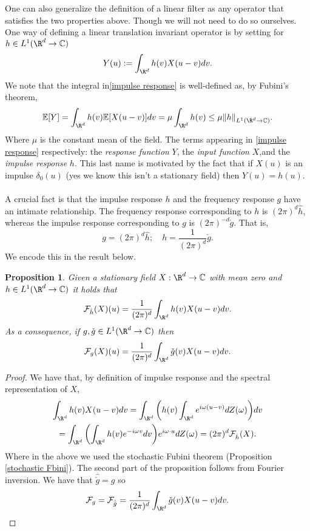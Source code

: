 \documentclass[12pt]{article}
\newtheorem{proposition}{Proposition}
\begin{document}
One can also generalize the definition of a linear filter as any operator that satisfies the two properties above. Though we will not need to do so ourselves. One way of defining a linear translation invariant operator is by setting for $h\in L^1(\R^d\to\C)$
\begin{equation}\label{impulse response}
    Y(u):=\int_{\R^d} h(v)X(u-v) dv.
\end{equation}
We note that the integral in\eqref{impulse response} is well-defined as, by Fubini's theorem,
\begin{equation*}
    \mathbb{E}[Y]=\int_{\R^d} h(v)\mathbb{E}[X(u-v)] dv=\mu\int_{\R^d} h(v)\leq \mu\norm{h}_{L^1(\R^d\to\C)}.
\end{equation*}
Where $\mu$ is the constant mean of the field.
The terms appearing in \eqref{impulse response} respectively: the \emph{response function} $Y$,  the \emph{input function} $X$,and  the \emph{impulse response} $h$. This last name is motivated by the fact that if $X(u)$ is an impulse $\delta _0(u)$ (yes we know this isn't a stationary field) then $Y(u)=h(u)$.\\
\\
A crucial fact is that the impulse response $h$ and the frequency response $g$ have an intimate relationship. The frequency response corresponding to  $h$ is $(2\pi)^d\hat{h}$, whereas the impulse response corresponding to $g$ is $(2\pi)^{-d}\check{g}$. That is,
\begin{equation*}
    g=(2\pi)^d\hat{h};\quad h=\frac{1}{(2\pi)^d}\check{g}.
\end{equation*}
We encode this in the result below.
\begin{proposition}
    Given a  stationary field $X:\R^d\to\C$ with mean zero and\\ $h\in L^1(\R^d\to\C)$  it holds that
    \begin{equation*}
        \mathcal{F}_{\hat{h}}(X)(u)=\frac{1}{(2\pi)^d}\int_{\R^d} h(v)X(u-v) dv.
    \end{equation*}
    As a consequence, if  $g,\check{g}\in L^1(\R^d\to\C)$ then
    \begin{equation*}
        \mathcal{F}_g(X)(u)=\frac{1}{(2\pi)^d}\int_{\R^d} \check{g}(v)X(u-v) dv.
    \end{equation*}
\end{proposition}
\begin{proof}
    We have that, by definition of impulse response and the spectral representation of $X$,
    \begin{multline*}
        \int_{\R^d} h(v)X(u-v) dv= \int_{\R^d} \qty(h(v)\int_{\R^d} e^{i\omega (u-v)}dZ(\omega)) dv\\=\int_{\R^d}\qty(\int_{\R^d} h(v)e^{-i\omega v}dv) e^{i\omega\cdot u}dZ(\omega)=(2\pi)^d\Ff_{\hat{h}}(X).
    \end{multline*}
    Where in the above we used the stochastic Fubini theorem (Proposition \ref{stochastic Fbini}). The second part of the proposition follows from Fourier inversion. We have that $\hat{\check{g}}=g$ so
    \begin{equation*}
        \mathcal{F}_g=\mathcal{F}_{\hat{\check{g}}}=\frac{1}{(2\pi)^d}\int_{\R^d} \check{g}(v)X(u-v) dv.
    \end{equation*}
\end{proof}
\end{document}
